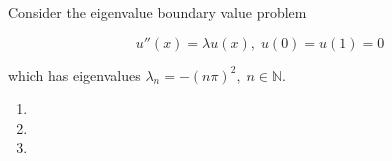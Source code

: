 Consider the eigenvalue boundary value problem

$$
u''(x) = \lambda u(x),\; u(0) = u(1) = 0
$$

which has eigenvalues $\lambda_n = -(n \pi)^2, \; n \in \mathbb{N}$.

\begin{enumerate}
  \item 
  \pagebreak
  \item 
  \pagebreak
  \item 
\end{enumerate} 